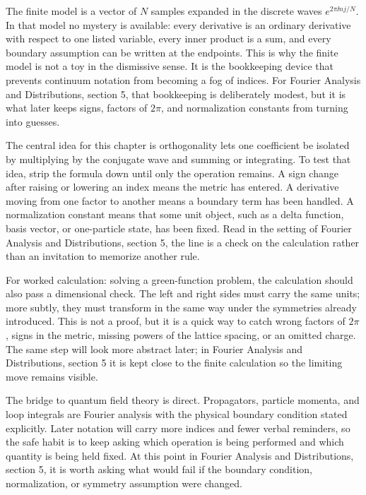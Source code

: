 The finite model is a vector of \(N\) samples expanded in the discrete waves \(e^{2\pi \ii nj/N}\).  In that model no mystery is available: every derivative is an ordinary derivative with respect to one listed variable, every inner product is a sum, and every boundary assumption can be written at the endpoints.  This is why the finite model is not a toy in the dismissive sense.  It is the bookkeeping device that prevents continuum notation from becoming a fog of indices.  For Fourier Analysis and Distributions, section 5, that bookkeeping is deliberately modest, but it is what later keeps signs, factors of \(2\pi\), and normalization constants from turning into guesses.

The central idea for this chapter is orthogonality lets one coefficient be isolated by multiplying by the conjugate wave and summing or integrating.  To test that idea, strip the formula down until only the operation remains.  A sign change after raising or lowering an index means the metric has entered.  A derivative moving from one factor to another means a boundary term has been handled.  A normalization constant means that some unit object, such as a delta function, basis vector, or one-particle state, has been fixed.  Read in the setting of Fourier Analysis and Distributions, section 5, the line is a check on the calculation rather than an invitation to memorize another rule.

For worked calculation: solving a green-function problem, the calculation should also pass a dimensional check.  The left and right sides must carry the same units; more subtly, they must transform in the same way under the symmetries already introduced.  This is not a proof, but it is a quick way to catch wrong factors of \(2\pi\), signs in the metric, missing powers of the lattice spacing, or an omitted charge.  The same step will look more abstract later; in Fourier Analysis and Distributions, section 5 it is kept close to the finite calculation so the limiting move remains visible.

The bridge to quantum field theory is direct.  Propagators, particle momenta, and loop integrals are Fourier analysis with the physical boundary condition stated explicitly.  Later notation will carry more indices and fewer verbal reminders, so the safe habit is to keep asking which operation is being performed and which quantity is being held fixed.  At this point in Fourier Analysis and Distributions, section 5, it is worth asking what would fail if the boundary condition, normalization, or symmetry assumption were changed.

